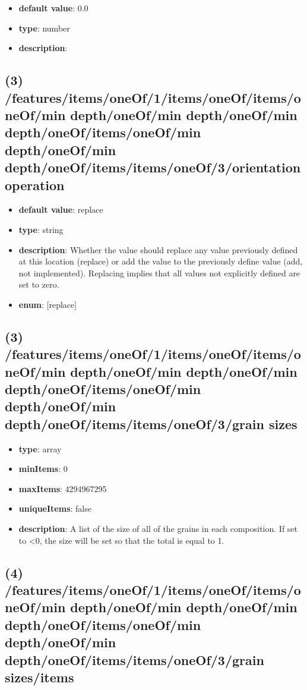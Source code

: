 \begin{itemize}[leftmargin=5em]\item {\bf default value}: 0.0
\item {\bf type}: number
\item {\bf description}: 
\end{itemize}\subsection{(3) /features/items/oneOf/1/items/oneOf/items/oneOf/min depth/oneOf/min depth/oneOf/min depth/oneOf/items/oneOf/min depth/oneOf/min depth/oneOf/items/items/oneOf/3/orientation operation}
\begin{itemize}[leftmargin=3em]\item {\bf default value}: replace
\item {\bf type}: string
\item {\bf description}: Whether the value should replace any value previously defined at this location (replace) or add the value to the previously define value (add, not implemented). Replacing implies that all values not explicitly defined are set to zero.
\item {\bf enum}: [replace]\end{itemize}\subsection{(3) /features/items/oneOf/1/items/oneOf/items/oneOf/min depth/oneOf/min depth/oneOf/min depth/oneOf/items/oneOf/min depth/oneOf/min depth/oneOf/items/items/oneOf/3/grain sizes}
\begin{itemize}[leftmargin=3em]\item {\bf type}: array
\item {\bf minItems}: 0
\item {\bf maxItems}: 4294967295
\item {\bf uniqueItems}: false
\item {\bf description}: A list of the size of all of the grains in each composition. If set to <0, the size will be set so that the total is equal to 1.
\end{itemize}\subsection{(4) /features/items/oneOf/1/items/oneOf/items/oneOf/min depth/oneOf/min depth/oneOf/min depth/oneOf/items/oneOf/min depth/oneOf/min depth/oneOf/items/items/oneOf/3/grain sizes/items}
